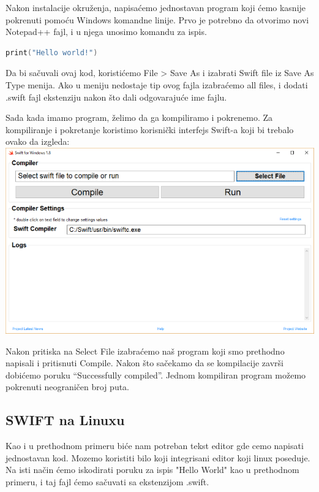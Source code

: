 \documentclass[a4paper]{article}
\begin{document}
Nakon instalacije okruženja, napisaćemo jednostavan program koji ćemo kasnije pokrenuti pomoću Windows komandne linije. Prvo je potrebno da otvorimo novi Notepad++ fajl, i u njega unosimo komandu za ispis.

\begin{lstlisting}[language=Swift]
print("Hello world!")
\end{lstlisting}
\vspace{3mm}
Da bi sačuvali ovaj kod, koristićemo File > Save As i izabrati Swift file iz Save As Type menija. Ako u meniju nedostaje tip ovog fajla izabraćemo all files, i dodati .swift fajl ekstenziju nakon što dali odgovarajuće ime fajlu.

Sada kada imamo program, želimo da ga kompiliramo i pokrenemo. Za kompiliranje i pokretanje koristimo korisnički interfejs Swift-a koji bi trebalo ovako da izgleda:\\

\includegraphics[scale=0.4]{swift-win.png}
\vspace{3mm}

Nakon pritiska na Select File izabraćemo naš program koji smo prethodno napisali i pritisnuti Compile. Nakon što sačekamo da se kompilacije završi dobićemo poruku “Successfully compiled”.
Jednom kompiliran program možemo pokrenuti neograničen broj puta.

\subsection{SWIFT na Linuxu}
\label{subsec:podnaslovLinux}

Kao i u prethodnom primeru biće nam potreban tekst editor gde cemo napisati jednostavan kod.
Mozemo koristiti bilo koji integrisani editor koji linux poseduje. Na isti način ćemo iskodirati poruku za ispis "Hello World" kao u prethodnom primeru, i taj fajl ćemo sačuvati sa ekstenzijom .swift.
\end{document}
